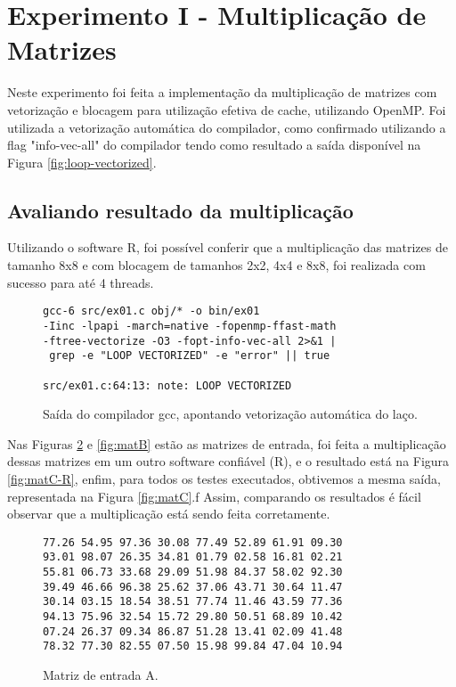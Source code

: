 \documentclass[conference]{IEEEtran}
\begin{document}
\section{Experimento I - Multiplicação de Matrizes}


Neste experimento foi feita a implementação da multiplicação de matrizes com vetorização e blocagem para utilização efetiva de cache, utilizando OpenMP.
Foi utilizada a vetorização automática do compilador, como confirmado utilizando a flag "info-vec-all" do compilador tendo como resultado a saída disponível na Figura \ref{fig:loop-vectorized}.


\subsection{Avaliando resultado da multiplicação}
Utilizando o software R, foi possível conferir que a multiplicação das matrizes de tamanho 8x8 e com blocagem de tamanhos 2x2, 4x4 e 8x8, foi realizada com sucesso para até 4 threads.

\begin{figure}[htb!]
\begin{adjustbox}{max width=\linewidth}
	\begin{BVerbatim}
gcc-6 src/ex01.c obj/* -o bin/ex01
-Iinc -lpapi -march=native -fopenmp-ffast-math
-ftree-vectorize -O3 -fopt-info-vec-all 2>&1 |
 grep -e "LOOP VECTORIZED" -e "error" || true
 
src/ex01.c:64:13: note: LOOP VECTORIZED
	\end{BVerbatim}
\end{adjustbox}
\caption{Saída do compilador gcc, apontando vetorização automática do laço.\label{fig:matA}}
\end{figure}

Nas Figuras \ref{fig:matA} e \ref{fig:matB} estão as matrizes de entrada, foi feita a multiplicação dessas matrizes em um outro software confiável (R), e o resultado está na Figura \ref{fig:matC-R}, enfim, para todos os testes executados, obtivemos a mesma saída, representada na Figura \ref{fig:matC}.f Assim, comparando os resultados é fácil observar que a multiplicação está sendo feita corretamente.

\begin{figure}[htb!]
\begin{adjustbox}{max width=\linewidth}
	\begin{BVerbatim}
77.26 54.95 97.36 30.08 77.49 52.89 61.91 09.30
93.01 98.07 26.35 34.81 01.79 02.58 16.81 02.21
55.81 06.73 33.68 29.09 51.98 84.37 58.02 92.30
39.49 46.66 96.38 25.62 37.06 43.71 30.64 11.47
30.14 03.15 18.54 38.51 77.74 11.46 43.59 77.36
94.13 75.96 32.54 15.72 29.80 50.51 68.89 10.42
07.24 26.37 09.34 86.87 51.28 13.41 02.09 41.48
78.32 77.30 82.55 07.50 15.98 99.84 47.04 10.94
	\end{BVerbatim}
\end{adjustbox}
\caption{Matriz de entrada A.\label{fig:matA}}
\end{figure}
\end{document}
